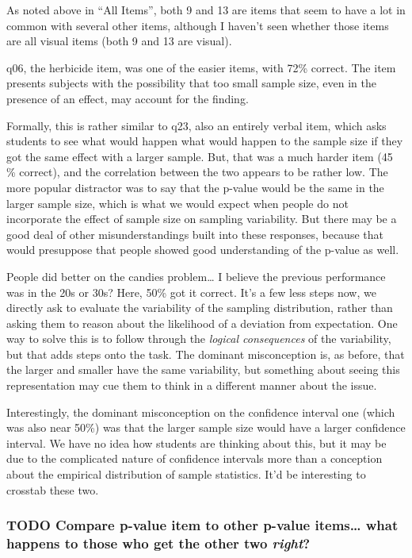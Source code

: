 \documentclass[11pt]{article}
\begin{document}
As noted above in ``All Items'', both 9 and 13 are items that seem to have a lot in common with several other items, although I haven't seen whether those items are all visual items (both 9 and 13 are visual).

q06, the herbicide item, was one of the easier items, with 72\% correct.  The item presents subjects with the possibility that too small sample size, even in the presence of an effect, may account for the finding.

Formally, this is rather similar to q23, also an entirely verbal item, which asks students to see what would happen what would happen to the sample size if they got the same effect with a larger sample.  But, that was a much harder item (45 \% correct), and the correlation between the two appears to be rather low. The more popular distractor was to say that the p-value would be the same in the larger sample size, which is what we would expect when people do not incorporate the effect of sample size on sampling variability.  But there may be a good deal of other misunderstandings built into these responses, because that would presuppose that people showed good understanding of the p-value as well.

People did better on the candies problem\ldots{} I believe the previous performance was in the 20s or 30s?  Here, 50\% got it correct.  It's a few less steps now, we directly ask to evaluate the variability of the sampling distribution, rather than asking them to reason about the likelihood of a deviation from expectation. One way to solve this is to follow through the \emph{logical consequences} of the variability, but that adds steps onto the task.  The dominant misconception is, as before, that the larger and smaller have the same variability, but something about seeing this representation may cue them to think in a different manner about the issue.

Interestingly, the dominant misconception on the confidence interval one (which was also near 50\%) was that the larger sample size would have a larger confidence interval.  We have no idea how students are thinking about this, but it may be due to the complicated nature of confidence intervals more than a conception about the empirical distribution of sample statistics. It'd be interesting to crosstab these two.


\subsubsection{{\bfseries\sffamily TODO} Compare p-value item to other p-value items\ldots{} what happens to those who get the other two \emph{right}?}
\label{sec-3-2-1}
\end{document}
